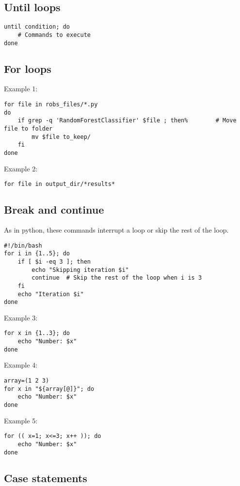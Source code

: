 \documentclass[24pt]{article}
\begin{document}
\subsection{Until loops}

\begin{lstlisting}
until condition; do
    # Commands to execute
done
\end{lstlisting}

\subsection{For loops}

Example 1:
\begin{lstlisting}
for file in robs_files/*.py
do  
    if grep -q 'RandomForestClassifier' $file ; then%        # Move file to folder
        mv $file to_keep/
    fi
done
\end{lstlisting}

Example 2:
\begin{lstlisting}
for file in output_dir/*results*
\end{lstlisting}

\subsection{Break and continue}
As in python, these commands interrupt a loop or skip the rest of the loop.

\begin{lstlisting}
#!/bin/bash
for i in {1..5}; do
    if [ $i -eq 3 ]; then
        echo "Skipping iteration $i"
        continue  # Skip the rest of the loop when i is 3
    fi
    echo "Iteration $i"
done
\end{lstlisting}

Example 3:
\begin{lstlisting}
for x in {1..3}; do
    echo "Number: $x"
done
\end{lstlisting}


Example 4:
\begin{lstlisting}
array=(1 2 3)
for x in "${array[@]}"; do
    echo "Number: $x"
done
\end{lstlisting}

Example 5:
\begin{lstlisting}
for (( x=1; x<=3; x++ )); do
    echo "Number: $x"
done
\end{lstlisting}


\subsection{Case statements}
\end{document}
